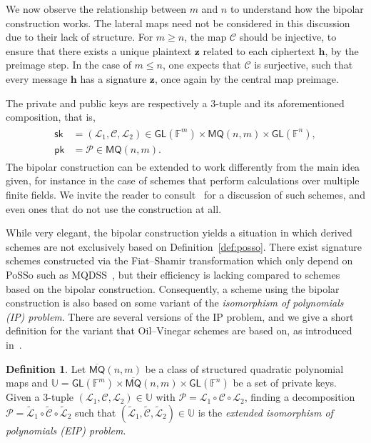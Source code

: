 \documentclass[12pt, a4paper, oneside]{memoir}
\theoremstyle{definition}
\newtheorem{definition}[theorem]{Definition}
\begin{document}
We now observe the relationship between $m$ and $n$ to understand how the bipolar construction works. The lateral maps need not be considered in this discussion due to their lack of structure. For $m \geq n$, the map $\mathcal{C}$ should be injective, to ensure that there exists a unique plaintext $\mathbf{z}$ related to each ciphertext $\mathbf{h}$, by the preimage step. In the case of $m \leq n$, one expects that $\mathcal{C}$ is surjective, such that every message $\mathbf{h}$ has a signature $\mathbf{z}$, once again by the central map preimage.

The private and public keys are respectively a $3$-tuple and its aforementioned composition, that is,
\begin{align}
  \begin{split}
    \mathsf{sk} &= (\mathcal{L}_{1}, \mathcal{C}, \mathcal{L}_{2}) 
      \in \mathsf{GL}(\mathbb{F}^{m}) \times \mathsf{MQ}(n, m) \times \mathsf{GL}(\mathbb{F}^{n}), \\
    \mathsf{pk} &= \mathcal{P} \in \mathsf{MQ}(n, m).
  \end{split}
\end{align}
The bipolar construction can be extended to work differently from the main idea given, for instance in the case of schemes that perform calculations over multiple finite fields. We invite the reader to consult~\cite[Sec.~2.2]{Petzoldt:201307} for a discussion of such schemes, and even ones that do not use the construction at all.

While very elegant, the bipolar construction yields a situation in which derived schemes are not exclusively based on Definition~\ref{def:posso}. There exist signature schemes constructed via the Fiat--Shamir transformation which only depend on \textsf{PoSSo} such as MQDSS~\cite{Chen:201612}, but their efficiency is lacking compared to schemes based on the bipolar construction. Consequently, a scheme using the bipolar construction is also based on some variant of the \emph{isomorphism of polynomials (IP) problem}. There are several versions of the IP problem, and we give a short definition for the variant that Oil--Vinegar schemes are based on, as introduced in~\cite{Ding:200806}.

\begin{definition}\label{def:eip}
  Let $\overline{\mathsf{MQ}}(n, m)$ be a class of structured quadratic polynomial maps and $\mathbb{U} = \mathsf{GL}(\mathbb{F}^{m}) \times \overline{\mathsf{MQ}}(n, m) \times \mathsf{GL}(\mathbb{F}^{n})$ be a set of private keys. Given a $3$-tuple $(\mathcal{L}_{1}, \mathcal{C}, \mathcal{L}_{2}) \in \mathbb{U}$ with $\mathcal{P} = \mathcal{L}_{1} \circ \mathcal{C} \circ \mathcal{L}_{2}$, finding a decomposition $\mathcal{P} = \widetilde{\mathcal{L}}_{1} \circ \widetilde{\mathcal{C}} \circ \widetilde{\mathcal{L}}_{2}$ such that $(\widetilde{\mathcal{L}}_{1}, \widetilde{\mathcal{C}}, \widetilde{\mathcal{L}}_{2}) \in \mathbb{U}$ is the \emph{extended isomorphism of polynomials (EIP) problem}.
\end{definition}
\end{document}
